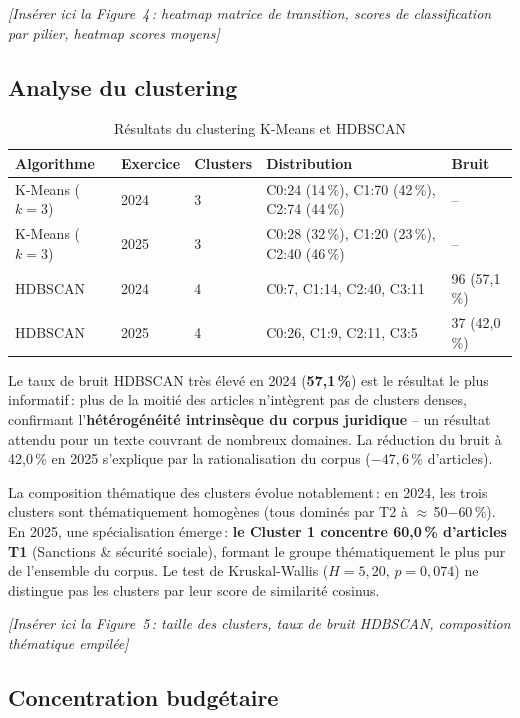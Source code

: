 \documentclass[12pt, a4paper]{article}
\newcommand{\figref}[1]{\textcolor{bleuCMR}{\textit{[#1]}}}
\begin{document}
\figref{Insérer ici la Figure~4\,: heatmap matrice de transition, scores de classification par pilier, heatmap scores moyens}

\subsection{Analyse du clustering}

\begin{table}[H]
\centering
\caption{Résultats du clustering K-Means et HDBSCAN}
\label{tab:clusters}
\small
\begin{tabularx}{\linewidth}{lXXXX}
\toprule
\rowcolor{bleuCMR!15}
\textbf{Algorithme} & \textbf{Exercice} & \textbf{Clusters} & \textbf{Distribution} & \textbf{Bruit} \\
\midrule
K-Means ($k=3$) & 2024 & 3 & C0:24 (14\,\%), C1:70 (42\,\%), C2:74 (44\,\%) & -- \\
K-Means ($k=3$) & 2025 & 3 & C0:28 (32\,\%), C1:20 (23\,\%), C2:40 (46\,\%) & -- \\
\midrule
HDBSCAN & 2024 & 4 & C0:7, C1:14, C2:40, C3:11 & 96 (57,1\,\%) \\
HDBSCAN & 2025 & 4 & C0:26, C1:9, C2:11, C3:5 & 37 (42,0\,\%) \\
\bottomrule
\end{tabularx}
\end{table}

Le taux de bruit HDBSCAN très élevé en 2024 (\textbf{57,1\,\%}) est le résultat le plus informatif\,: 
plus de la moitié des articles n'intègrent pas de clusters denses, confirmant l'\textbf{hétérogénéité 
intrinsèque du corpus juridique} -- un résultat attendu pour un texte couvrant de nombreux domaines. 
La réduction du bruit à 42,0\,\% en 2025 s'explique par la rationalisation du corpus ($-47{,}6\,\%$ d'articles).

La composition thématique des clusters évolue notablement\,: en 2024, les trois clusters sont 
thématiquement homogènes (tous dominés par T2 à $\approx$\,50$-$60\,\%). En 2025, une spécialisation 
émerge\,: \textbf{le Cluster 1 concentre 60,0\,\% d'articles T1} (Sanctions \& sécurité sociale), 
formant le groupe thématiquement le plus pur de l'ensemble du corpus. Le test de Kruskal-Wallis 
($H=5{,}20$, $p=0{,}074$) ne distingue pas les clusters par leur score de similarité cosinus.

\figref{Insérer ici la Figure~5\,: taille des clusters, taux de bruit HDBSCAN, composition thématique empilée}

\subsection{Concentration budgétaire}
\end{document}
